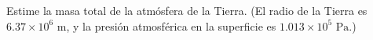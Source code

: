\item Estime la masa total de la atmósfera de la Tierra. (El radio de la Tierra es $6.37 \times 10^6 \text{ m}$, y la presión atmosférica en la superficie es $1.013 \times 10^5 \text{ Pa}$.)
